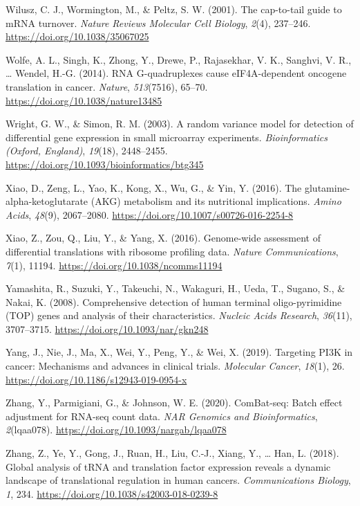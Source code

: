 \documentclass[12pt,openany]{book}
\begin{document}
\hypertarget{ref-Wilusz2001}{}
Wilusz, C. J., Wormington, M., \& Peltz, S. W. (2001). The cap-to-tail
guide to mRNA turnover. \emph{Nature Reviews Molecular Cell Biology},
\emph{2}(4), 237--246. \url{https://doi.org/10.1038/35067025}

\hypertarget{ref-Wolfe2014}{}
Wolfe, A. L., Singh, K., Zhong, Y., Drewe, P., Rajasekhar, V. K.,
Sanghvi, V. R., \ldots{} Wendel, H.-G. (2014). RNA G-quadruplexes cause
eIF4A-dependent oncogene translation in cancer. \emph{Nature},
\emph{513}(7516), 65--70. \url{https://doi.org/10.1038/nature13485}

\hypertarget{ref-Wright2003}{}
Wright, G. W., \& Simon, R. M. (2003). A random variance model for
detection of differential gene expression in small microarray
experiments. \emph{Bioinformatics (Oxford, England)}, \emph{19}(18),
2448--2455. \url{https://doi.org/10.1093/bioinformatics/btg345}

\hypertarget{ref-Xiao2016a}{}
Xiao, D., Zeng, L., Yao, K., Kong, X., Wu, G., \& Yin, Y. (2016). The
glutamine-alpha-ketoglutarate (AKG) metabolism and its nutritional
implications. \emph{Amino Acids}, \emph{48}(9), 2067--2080.
\url{https://doi.org/10.1007/s00726-016-2254-8}

\hypertarget{ref-Xiao2016}{}
Xiao, Z., Zou, Q., Liu, Y., \& Yang, X. (2016). Genome-wide assessment
of differential translations with ribosome profiling data. \emph{Nature
Communications}, \emph{7}(1), 11194.
\url{https://doi.org/10.1038/ncomms11194}

\hypertarget{ref-Yamashita2008}{}
Yamashita, R., Suzuki, Y., Takeuchi, N., Wakaguri, H., Ueda, T., Sugano,
S., \& Nakai, K. (2008). Comprehensive detection of human terminal
oligo-pyrimidine (TOP) genes and analysis of their characteristics.
\emph{Nucleic Acids Research}, \emph{36}(11), 3707--3715.
\url{https://doi.org/10.1093/nar/gkn248}

\hypertarget{ref-Yang2019}{}
Yang, J., Nie, J., Ma, X., Wei, Y., Peng, Y., \& Wei, X. (2019).
Targeting PI3K in cancer: Mechanisms and advances in clinical trials.
\emph{Molecular Cancer}, \emph{18}(1), 26.
\url{https://doi.org/10.1186/s12943-019-0954-x}

\hypertarget{ref-Zhang2020}{}
Zhang, Y., Parmigiani, G., \& Johnson, W. E. (2020). ComBat-seq: Batch
effect adjustment for RNA-seq count data. \emph{NAR Genomics and
Bioinformatics}, \emph{2}(lqaa078).
\url{https://doi.org/10.1093/nargab/lqaa078}

\hypertarget{ref-Zhang2018}{}
Zhang, Z., Ye, Y., Gong, J., Ruan, H., Liu, C.-J., Xiang, Y., \ldots{}
Han, L. (2018). Global analysis of tRNA and translation factor
expression reveals a dynamic landscape of translational regulation in
human cancers. \emph{Communications Biology}, \emph{1}, 234.
\url{https://doi.org/10.1038/s42003-018-0239-8}
\end{document}
